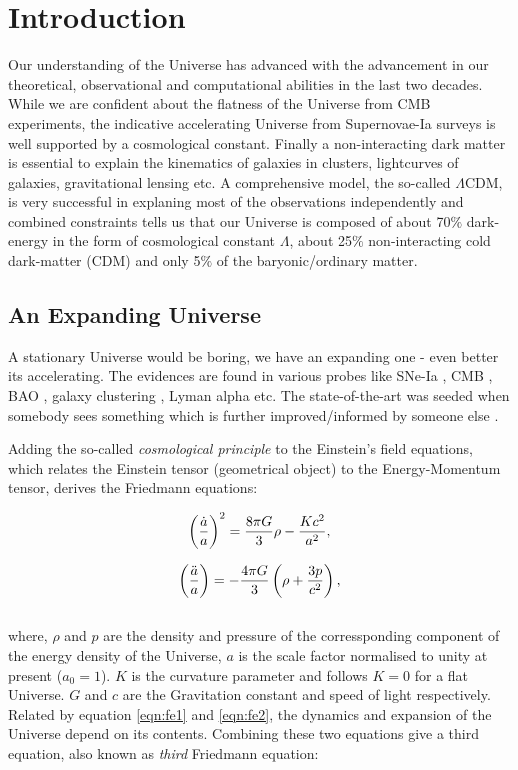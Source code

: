 \chapter{Introduction}\label{Introduction}

Our understanding of the Universe has advanced with the advancement in our 
theoretical, observational and computational abilities in the last two decades. 
While we are confident about the flatness of the Universe from CMB experiments, 
the indicative accelerating Universe from Supernovae-Ia surveys is well supported
by a cosmological constant. Finally a non-interacting dark matter is essential 
to explain the kinematics of galaxies in clusters, lightcurves of galaxies, 
gravitational lensing etc. A comprehensive model, the so-called $\Lambda$CDM,
is very successful in explaning most of the observations independently and 
combined constraints tells us that our Universe is composed of about 70$\%$
dark-energy in the form of cosmological constant $\Lambda$, about 25$\%$ non-interacting
cold dark-matter (CDM) and only 5$\%$ of the baryonic/ordinary matter. 




\section{An Expanding Universe}

A stationary Universe would be boring, we have an expanding one - even better its
accelerating. The evidences are found in various probes like SNe-Ia \cite{}, 
CMB \cite{}, BAO \cite{}, galaxy clustering \cite{}, Lyman alpha \cite{} etc. 
The state-of-the-art was seeded when somebody sees something \cite{} which is 
further improved/informed by someone else \cite{}. 

Adding the so-called {\it cosmological principle} to the Einstein's field equations, 
which relates the Einstein tensor (geometrical object) to the Energy-Momentum tensor, 
derives the Friedmann equations:

\begin{equation}
\centering
\left( \dfrac{\dot{a}}{a} \right)^2 = \dfrac{8 \pi G}{3} \rho - \dfrac{Kc^2}{a^2},
\label{eqn:fe1}
\end{equation}

\begin{equation}
\centering
\left( \dfrac{\ddot{a}}{a} \right) = -\dfrac{4 \pi G}{3} \left( \rho + \dfrac{3p}{c^2} \right),
\label{eqn:fe2}
\end{equation}
\\
where, $\rho$ and $p$ are the density and pressure of the corressponding component of
the energy density of the Universe, $a$ is the scale factor normalised to unity at present ($a_0=1$).
$K$ is the curvature parameter and follows $K=0$ for a flat Universe. $G$ and $c$ are
the Gravitation constant and speed of light respectively. Related by equation \ref{eqn:fe1} 
and \ref{eqn:fe2}, the dynamics and expansion of the Universe depend on its contents. 
Combining these two equations give a third equation, also known as {\it third} Friedmann
equation:

